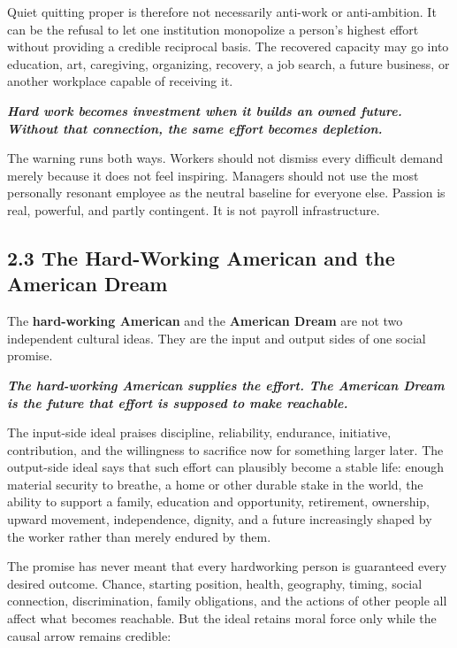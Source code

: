 \documentclass[11pt,oneside]{article}
\renewenvironment{quote}
  {\begin{tcolorbox}[
      enhanced,
      breakable,
      colback=ManifestLight,
      colframe=ManifestRule,
      boxrule=0pt,
      leftrule=3pt,
      arc=0pt,
      outer arc=0pt,
      left=10pt,right=10pt,top=8pt,bottom=8pt,
      before skip=0.8em,after skip=0.8em
    ]\itshape}
  {\end{tcolorbox}}
\begin{document}
Quiet quitting proper is therefore not necessarily anti-work or
anti-ambition. It can be the refusal to let one institution monopolize a
person's highest effort without providing a credible reciprocal basis.
The recovered capacity may go into education, art, caregiving,
organizing, recovery, a job search, a future business, or another
workplace capable of receiving it.

\begin{quote}
\textbf{Hard work becomes investment when it builds an owned future.
Without that connection, the same effort becomes depletion.}
\end{quote}

The warning runs both ways. Workers should not dismiss every difficult
demand merely because it does not feel inspiring. Managers should not
use the most personally resonant employee as the neutral baseline for
everyone else. Passion is real, powerful, and partly contingent. It is
not payroll infrastructure.


\subsection{2.3 The Hard-Working American and the American
Dream}\label{the-hard-working-american-and-the-american-dream}

The \textbf{hard-working American} and the \textbf{American Dream} are
not two independent cultural ideas. They are the input and output sides
of one social promise.

\begin{quote}
\textbf{The hard-working American supplies the effort. The American Dream
is the future that effort is supposed to make reachable.}
\end{quote}

The input-side ideal praises discipline, reliability, endurance,
initiative, contribution, and the willingness to sacrifice now for
something larger later. The output-side ideal says that such effort can
plausibly become a stable life: enough material security to breathe, a
home or other durable stake in the world, the ability to support a
family, education and opportunity, retirement, ownership, upward
movement, independence, dignity, and a future increasingly shaped by the
worker rather than merely endured by them.

The promise has never meant that every hardworking person is guaranteed
every desired outcome. Chance, starting position, health, geography,
timing, social connection, discrimination, family obligations, and the
actions of other people all affect what becomes reachable. But the ideal
retains moral force only while the causal arrow remains credible:
\end{document}
